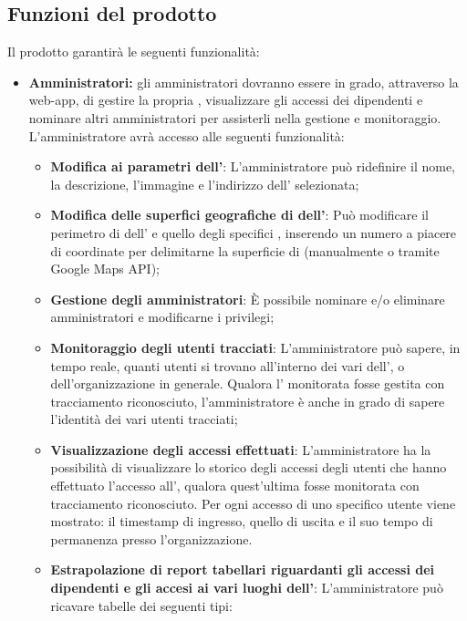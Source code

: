 \subsection{Funzioni del prodotto}
Il prodotto garantirà le seguenti funzionalità:
\begin{itemize}
    \item \textbf{Amministratori:} gli amministratori dovranno essere in grado, attraverso la web-app, di gestire la propria , visualizzare gli accessi dei dipendenti e nominare altri amministratori per assisterli nella gestione e monitoraggio. \\
        L'amministratore avrà accesso alle seguenti funzionalità:
        \begin{itemize}
            \item \textbf{Modifica ai parametri dell'}: L'amministratore può ridefinire il nome, la descrizione, l'immagine e l'indirizzo dell' selezionata;
            \item \textbf{Modifica delle superfici geografiche di  dell'}: Può modificare il perimetro di  dell' e quello degli specifici , inserendo un numero a piacere di coordinate per delimitarne la superficie di  (manualmente o tramite Google Maps API);
            \item \textbf{Gestione degli amministratori}: È possibile nominare e/o eliminare amministratori e modificarne i privilegi;
            \item \textbf{Monitoraggio degli utenti tracciati}: L'amministratore può sapere, in tempo reale, quanti utenti si trovano all'interno dei vari  dell', o dell'organizzazione in generale. Qualora l' monitorata fosse gestita con tracciamento riconosciuto, l'amministratore è anche in grado di sapere l'identità dei vari utenti tracciati;
            \item \textbf{Visualizzazione degli accessi effettuati}: L'amministratore ha la possibilità di visualizzare lo storico degli accessi degli utenti che hanno effettuato l'accesso all', qualora quest'ultima fosse monitorata con tracciamento riconosciuto. Per ogni accesso di uno specifico utente viene mostrato: il timestamp di ingresso, quello di uscita e il suo tempo di permanenza presso l'organizzazione.
            \item \textbf{Estrapolazione di report tabellari riguardanti gli accessi dei dipendenti e gli accesi ai vari luoghi dell'}: L'amministratore può ricavare tabelle dei seguenti tipi:

\end{itemize}
\end{itemize}
